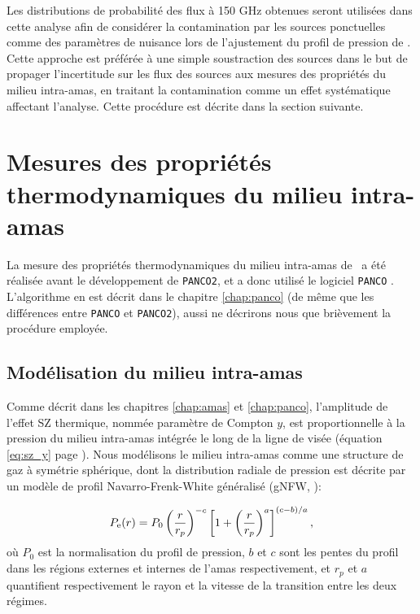 Les distributions de probabilité des flux à 150 GHz obtenues seront utilisées dans cette analyse afin de considérer la contamination par les sources ponctuelles comme des paramètres de nuisance lors de l'ajustement du profil de pression de \act.
Cette approche est préférée à une simple soustraction des sources dans le but de propager l'incertitude sur les flux des sources aux mesures des propriétés du milieu intra-amas, en traitant la contamination comme un effet systématique affectant l'analyse.
Cette procédure est décrite dans la section suivante.

\section{Mesures des propriétés thermodynamiques du milieu intra-amas}

La mesure des propriétés thermodynamiques du milieu intra-amas de \act\ a été réalisée avant le développement de \texttt{PANCO2}, et a donc utilisé le logiciel \texttt{PANCO} \cite{ruppin_cosmologie_2018}.
L'algorithme en est décrit dans le chapitre \ref{chap:panco} (de même que les différences entre \texttt{PANCO} et \texttt{PANCO2}), aussi ne décrirons nous que brièvement la procédure employée.

\subsection{Modélisation du milieu intra-amas}

Comme décrit dans les chapitres \ref{chap:amas} et \ref{chap:panco}, l'amplitude de l'effet SZ thermique, nommée paramètre de Compton $y$, est proportionnelle à la pression du milieu intra-amas intégrée le long de la ligne de visée (équation \ref{eq:sz_y} page \pageref{eq:sz_y}).
Nous modélisons le milieu intra-amas comme une structure de gaz à symétrie sphérique, dont la distribution radiale de pression est décrite par un modèle de profil Navarro-Frenk-White généralisé (gNFW, \cite{nagai_effects_2007}):

\begin{equation}
    P_{\rm e}(r) = P_0 \left(\frac{r}{r_p}\right)^{-c}
        \left[1 + \left(\frac{r}{r_p}\right)^{a}\right]^{(c-b)/a},
\end{equation}
où $P_0$ est la normalisation du profil de pression, $b$ et $c$ sont les pentes du profil dans les régions externes et internes de l'amas respectivement, et $r_p$ et $a$ quantifient respectivement le rayon et la vitesse de la transition entre les deux régimes.

